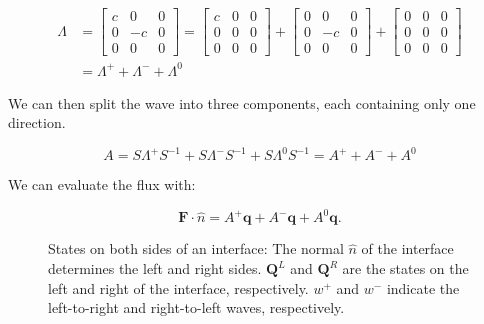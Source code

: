 \begin{equation}
	\begin{split}
		\Lambda & = 
        \begin{bmatrix}
            c & 0 & 0 \\ 
            0 & -c & 0 \\ 
            0 & 0 & 0
		\end{bmatrix} = 
		\begin{bmatrix}
            c & 0 & 0 \\ 
            0 & 0 & 0 \\ 
            0 & 0 & 0
		\end{bmatrix} +
		\begin{bmatrix}
            0 & 0 & 0 \\ 
            0 & -c & 0 \\ 
            0 & 0 & 0
		\end{bmatrix} +
		\begin{bmatrix}
            0 & 0 & 0 \\ 
            0 & 0 & 0 \\ 
            0 & 0 & 0
		\end{bmatrix} \\
		&= \Lambda^+ + \Lambda^- + \Lambda^0
	\end{split}
\end{equation}

We can then split the wave into three components, each containing only one direction.

\begin{equation}
	A = S \Lambda^+ S^{-1} + S \Lambda^- S^{-1} + S \Lambda^0 S^{-1} = A^+ + A^- + A^0
\end{equation}

We can evaluate the flux with:

\begin{equation} \label{equ:flux}
	\mathbf{F} \cdot \widehat{n} = A^+\mathbf{q} + A^-\mathbf{q} + A^0 \mathbf{q}.
\end{equation}

\begin{figure}[H]
	\centering
	
	\caption{States on both sides of an interface: The normal $\widehat{n}$ of the interface
	    determines the left and right sides. $\mathbf{Q}^L$ and $\mathbf{Q}^R$ are the states on the
	    left and right of the interface, respectively. $w^+$ and $w^-$ indicate the left-to-right
	    and right-to-left waves, respectively.}
	\label{fig:waves}
\end{figure}

